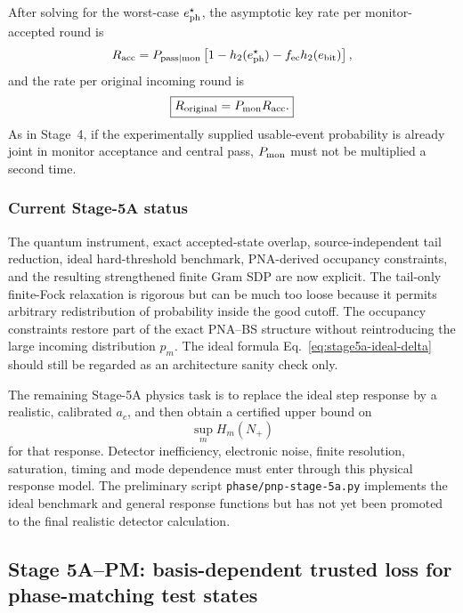 \documentclass[11pt]{article}
\theoremstyle{remark}
\begin{document}
After solving for the worst-case \(e_{\rm ph}^\star\), the asymptotic key rate
per monitor-accepted round is
\begin{equation}
    R_{\rm acc}
    =
    P_{\rm pass|mon}
    \left[
      1-h_2(e_{\rm ph}^\star)
      -f_{\rm ec}h_2(e_{\rm bit})
    \right],
    \label{eq:stage5a-rate-accepted}
\end{equation}
and the rate per original incoming round is
\begin{equation}
    \boxed{
    R_{\rm original}
    =
    P_{\rm mon}R_{\rm acc}.
    }
    \label{eq:stage5a-rate-original}
\end{equation}
As in Stage~4, if the experimentally supplied usable-event probability is
already joint in monitor acceptance and central pass, \(P_{\rm mon}\) must not
be multiplied a second time.

\subsubsection{Current Stage-5A status}

The quantum instrument, exact accepted-state overlap, source-independent tail
reduction, ideal hard-threshold benchmark, PNA-derived occupancy constraints,
and the resulting strengthened finite Gram SDP are now explicit.  The
tail-only finite-Fock relaxation is rigorous but can be much too loose because
it permits arbitrary redistribution of probability inside the good cutoff.
The occupancy constraints restore part of the exact PNA--BS structure without
reintroducing the large incoming distribution \(p_m\).  The ideal formula
Eq.~\eqref{eq:stage5a-ideal-delta} should still be regarded as an architecture
sanity check only.

The remaining Stage-5A physics task is to replace the ideal step response by a
realistic, calibrated \(a_c\), and then obtain a certified upper bound on
\[
    \sup_m H_m(N_+)
\]
for that response.  Detector inefficiency, electronic noise, finite
resolution, saturation, timing and mode dependence must enter through this
physical response model.  The preliminary script
\texttt{phase/pnp-stage-5a.py} implements the ideal benchmark and general
response functions but has not yet been promoted to the final realistic
detector calculation.


\subsection{Stage 5A--PM: basis-dependent trusted loss for phase-matching test states}
\label{sec:stage5a-pm}
\end{document}
